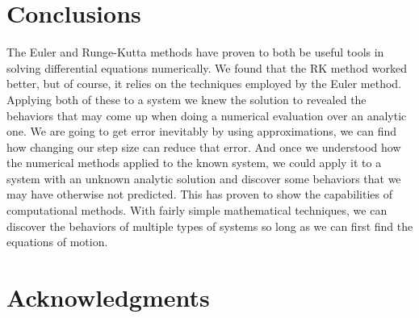 \documentclass[aps,prl,twocolumn,superscriptaddress]{revtex4-1}
\begin{document}
\section{Conclusions}
The Euler and Runge-Kutta methods have proven to both be useful tools in solving differential equations numerically. We found that the RK method worked better, but of course, it relies on the techniques employed by the Euler method. Applying both of these to a system we knew the solution to revealed the behaviors that may come up when doing a numerical evaluation over an analytic one. We are going to get error inevitably by using approximations, we can find how changing our step size can reduce that error. And once we understood how the numerical methods applied to the known system, we could apply it to a system with an unknown analytic solution and discover some behaviors that we may have otherwise not predicted. This has proven to show the capabilities of computational methods. With fairly simple mathematical techniques, we can discover the behaviors of multiple types of systems so long as we can first find the equations of motion.
\section*{Acknowledgments}
\setlength{\parindent}{0cm}



\end{document}
